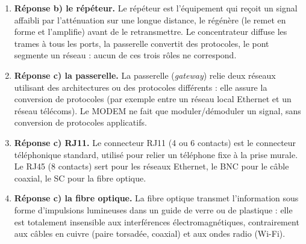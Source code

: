 \documentclass[11pt]{article}
\newcommand{\cle}[1]{{\popxbold\color{popdark}#1}}
\begin{document}
\begin{corrige}
\begin{enumerate}
  \item \textbf{Réponse b) le \cle{répéteur}.} Le \cle{répéteur} est l'équipement qui reçoit un signal affaibli par l'\cle{atténuation} sur une longue distance, le \cle{régénère} (le remet en forme et l'amplifie) avant de le retransmettre. Le \cle{concentrateur} diffuse les trames à tous les ports, la \cle{passerelle} convertit des protocoles, le \cle{pont} segmente un réseau : aucun de ces trois rôles ne correspond.
  \item \textbf{Réponse c) la \cle{passerelle}.} La \cle{passerelle} (\emph{gateway}) relie deux réseaux utilisant des architectures ou des protocoles différents : elle assure la \cle{conversion de protocoles} (par exemple entre un réseau local Ethernet et un réseau télécoms). Le \cle{MODEM} ne fait que \cle{moduler}/\cle{démoduler} un signal, sans conversion de protocoles applicatifs.
  \item \textbf{Réponse c) \cle{RJ11}.} Le connecteur \cle{RJ11} (4 ou 6 contacts) est le connecteur téléphonique standard, utilisé pour relier un téléphone fixe à la prise murale. Le \cle{RJ45} (8 contacts) sert pour les réseaux Ethernet, le \cle{BNC} pour le câble coaxial, le \cle{SC} pour la fibre optique.
  \item \textbf{Réponse c) la \cle{fibre optique}.} La \cle{fibre optique} transmet l'information sous forme d'impulsions lumineuses dans un guide de verre ou de plastique : elle est totalement \cle{insensible aux interférences électromagnétiques}, contrairement aux câbles en cuivre (paire torsadée, coaxial) et aux ondes radio (Wi-Fi).
\end{enumerate}
\end{corrige}
\end{document}
